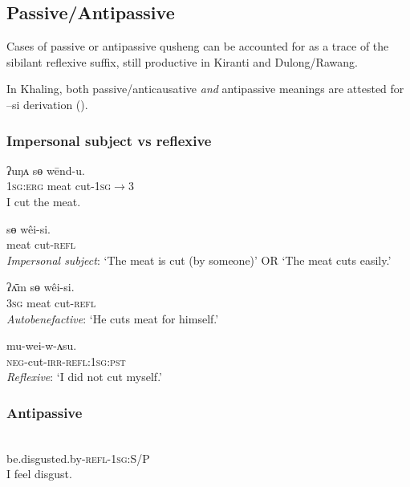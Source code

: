 \documentclass[oldfontcommands,oneside,a4paper,11pt]{article}
\newcommand{\ipa}[1]{{\phon \mbox{#1}}} %
\begin{document}
\subsection{Passive/Antipassive}
Cases of passive or antipassive qusheng can be accounted for as a trace of the sibilant reflexive suffix, still productive in Kiranti and Dulong/Rawang.

In Khaling, both passive/anticausative \textit{and} antipassive meanings are attested for \ipa{--si} derivation (\citealt{jacques16si}).
\subsubsection{Impersonal subject vs reflexive} 
\begin{exe}
\ex \label{ex:wendu} 
\gll 
\ipa{ʔuŋʌ}  	\ipa{sɵ}  	\ipa{wēnd-u.}  \\
\textsc{1sg:erg} meat cut-\textsc{1sg$\rightarrow$3} \\
\glt I cut the meat.
\end{exe}

\begin{exe}
\ex \label{ex:weisi} 
\gll 
 \ipa{sɵ}  	\ipa{wêi-si.}  \\
 meat cut-\textsc{refl} \\
\glt \textit{Impersonal subject}: `The meat is cut (by someone)' OR `The meat cuts easily.'
\end{exe}

\begin{exe}
\ex \label{ex:weisi2} 
\gll 
 \ipa{ʔʌ̄m} \ipa{sɵ}  	\ipa{wêi-si.}  \\
\textsc{3sg} meat cut-\textsc{refl} \\
\glt \textit{Autobenefactive}: `He cuts meat for himself.'
\end{exe}
 
\begin{exe}
\ex \label{ex:weiwasu} 
\gll 
	\ipa{mu-wei-w-ʌsu.}  \\
\textsc{neg}-cut-\textsc{irr}-\textsc{refl:1sg:pst} \\
\glt \textit{Reflexive}: `I did not cut myself.'
\end{exe}  
\subsubsection{Antipassive} 
\begin{exe}
\ex \label{ex:ghryamtsi} 
\gll \ipa{gʰrɛ̄m-si-ŋʌ}\\
 be.disgusted.by-\textsc{refl-1sg:S/P} \\
\glt  I feel disgust.
\end{exe}
\end{document}
